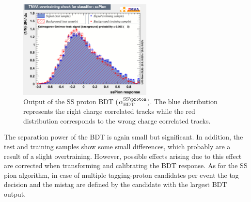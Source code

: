 \begin{figure}[tbp]
	\begin{center}
		\includegraphics[width=0.6\textwidth]{09FlavourTagging/figs/SSProton_overtrain.pdf}
	\end{center}
	\caption{Output of the SS proton BDT ($\alpha^{\text{SS}\proton}_\text{BDT}$).
	The blue distribution represents the right charge correlated tracks while the red distribution corresponds to the wrong charge correlated tracks.}
	\label{fig:SSProtonBDTOutput}
\end{figure}
The separation power of the BDT is again small but significant.
In addition, the test and training samples show some small differences, which probably are a result of a slight overtraining.
However, possible effects arising due to this effect are corrected when transforming and calibrating the BDT response.
As for the SS pion algorithm, in case of multiple tagging-proton candidates per event the tag decision and the mistag are defined by the candidate with the largest BDT output.

